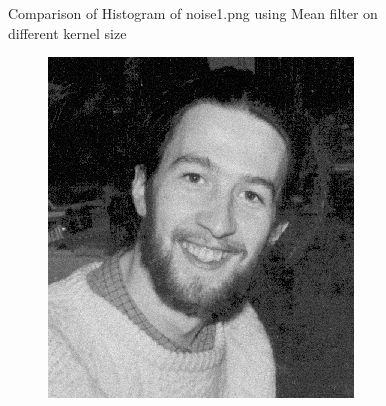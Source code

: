 \documentclass[12pt,a4paper]{report}
\begin{document}
\begin{figure}[!htb]
\begin{minipage}{\linewidth}
  \caption{Comparison of Histogram of noise1.png using Mean filter on different kernel size}
\label{fig:n1-mean-hist}
\end{minipage}
\end{figure}
\begin{figure}[!htb]
  \begin{minipage}{\linewidth}
    \centering
    \begin{subfigure}{0.49\textwidth}
      \includegraphics[width=\linewidth]{test_img/noise2.png}
    \end{subfigure}
    \begin{subfigure}{0.49\textwidth}

\end{subfigure}
\end{minipage}
\end{figure}
\end{document}
